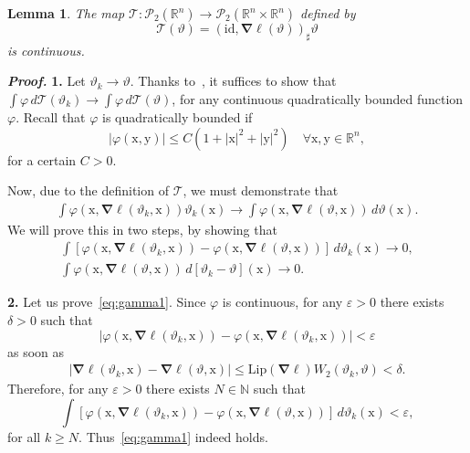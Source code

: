 \documentclass[sn-mathphys-num]{sn-jnl}
\numberwithin{equation}{section}
\theoremstyle{mythm}
\newtheorem{lemma}[proposition]{Lemma}
\theoremstyle{mydef}
\renewenvironment{proof}{\smallskip\noindent\emph{\textbf{Proof.}}%
  \hspace{1pt}}{\hspace{-5pt}{\nobreak\quad\nobreak\hfill\nobreak%
    $\square$\vspace{2pt}\par}\smallskip\goodbreak}
\newcommand{\Lip}{\mathrm{Lip}}
\renewcommand{\phi}{\varphi}
\renewcommand{\d}{\,d}
\newcommand{\id}{\mathrm{id}}
\begin{document}
  \begin{lemma}
    \label{lem:terminal_map}
    The map \( \mathcal{T} \colon \mathcal{P}_2(\mathbb{R}^n)\to \mathcal{P}_2(\mathbb{R}^n \times \mathbb{R}^n) \) defined by
    \[
      \mathcal{T}(\vartheta) = (\id, \bm\nabla \ell(\vartheta))_{\sharp}\vartheta
    \]
    is continuous.
  \end{lemma}
  \begin{proof}
    \textbf{1.}
  Let \( \vartheta_k\to \vartheta \).
  Thanks to~\cite[Theorem 6.9]{zbMATH05306371}, it suffices to show that \( \int \varphi \d \mathcal{T}(\vartheta_k)\to \int \phi \d \mathcal{T}(\vartheta) \), for any continuous quadratically bounded function \( \phi \).
  Recall that \( \varphi \) is quadratically bounded if
\[
  |\varphi(\mathrm{x},\mathrm{y})| \le C\left(1+|\mathrm{x}|^2 + |\mathrm{y}|^{2}\right) \quad \forall \mathrm{x},\mathrm{y} \in \mathbb{R}^{n},
\]
for a certain \( C>0 \).

Now, due to the definition of \( \mathcal{T} \), we must demonstrate that
\begin{align*}
  \int \varphi \left( \mathrm{x}, \bm\nabla \ell\left(\vartheta_k,\mathrm{x}\right) \right)\vartheta_k(\mathrm{x}) \to
  \int \varphi \left( \mathrm{x}, \bm\nabla \ell\left(\vartheta,\mathrm{x}\right) \right)\d \vartheta(\mathrm{x}).
  \end{align*}
  We will prove this in two steps, by showing that
  \begin{align}
    \int \left[\varphi \left( \mathrm{x}, \bm\nabla \ell\left(\vartheta_k,\mathrm{x}\right) \right) -
    \varphi \left( \mathrm{x}, \bm\nabla \ell\left(\vartheta,\mathrm{x}\right) \right)\right]\d \vartheta_k(\mathrm{x})\to 0,\label{eq:gamma1}\\
    \int \varphi \left( \mathrm{x}, \bm\nabla \ell\left(\vartheta,\mathrm{x}\right) \right)\d\left[ \vartheta_k - \vartheta\right](\mathrm{x})\to 0.\label{eq:gamma2}
  \end{align}

  \textbf{2.} Let us prove~\eqref{eq:gamma1}.
  Since \( \varphi \) is continuous, for any \( \varepsilon>0 \) there exists \( \delta>0 \) such that
  \[
    \left|\varphi \left( \mathrm{x}, \bm\nabla \ell\left(\vartheta_k,\mathrm{x}\right)\right) -
    \varphi \left( \mathrm{x}, \bm\nabla \ell\left(\vartheta_k,\mathrm{x}\right) \right)\right|< \varepsilon
  \]
  as soon as
  \begin{align*}
    \left|\bm\nabla \ell\left(\vartheta_k,\mathrm{x}\right)
    -\bm\nabla \ell\left(\vartheta,\mathrm{x}\right)
    \right|\le \Lip(\bm\nabla \ell)W_2\left(\vartheta_k,\vartheta\right)<\delta.
  \end{align*}
  Therefore, for any \( \varepsilon>0 \) there exists \( N\in \mathbb{N} \) such that
\[
  \int \left[\varphi \left( \mathrm{x}, \bm\nabla \ell\left(\vartheta_k,\mathrm{x}\right) \right) -
  \varphi \left( \mathrm{x}, \bm\nabla \ell\left(\vartheta, \mathrm{x}\right) \right)\right]\d \vartheta_k(\mathrm{x})< \varepsilon,
\]
for all \( k\ge N \).
Thus~\eqref{eq:gamma1} indeed holds.


\end{proof}
\end{document}
